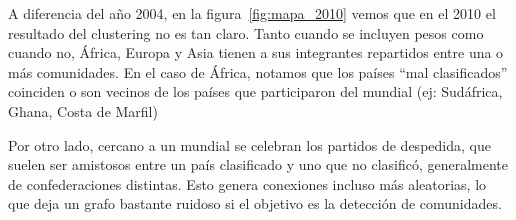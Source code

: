 \documentclass{article}
\begin{document}
A diferencia del año 2004, en la figura~\ref{fig:mapa_2010} vemos que en el 2010 el resultado del clustering no es tan claro. Tanto cuando se incluyen pesos como cuando no, África, Europa y Asia tienen a sus integrantes
repartidos entre una o más comunidades. En el caso de África, notamos que los países ``mal clasificados''
coinciden o son vecinos de los países que participaron del mundial (ej: Sudáfrica, Ghana, Costa de Marfil)

Por otro lado, cercano a un mundial se celebran los partidos de despedida, que suelen ser amistosos entre
un país clasificado y uno que no clasificó, generalmente de confederaciones distintas. Esto genera 
conexiones incluso más aleatorias, lo que deja un grafo bastante ruidoso si el objetivo es la detección
de comunidades.


\FloatBarrier


\end{document}
